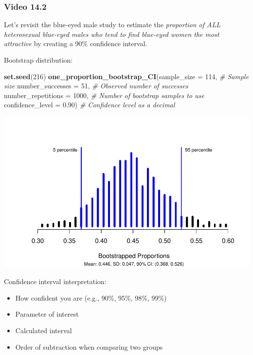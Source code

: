 \documentclass[
]{report}
\newenvironment{Shaded}{\begin{snugshade}}{\end{snugshade}}
\newcommand{\AttributeTok}[1]{\textcolor[rgb]{0.13,0.29,0.53}{#1}}
\newcommand{\CommentTok}[1]{\textcolor[rgb]{0.56,0.35,0.01}{\textit{#1}}}
\newcommand{\DecValTok}[1]{\textcolor[rgb]{0.00,0.00,0.81}{#1}}
\newcommand{\FloatTok}[1]{\textcolor[rgb]{0.00,0.00,0.81}{#1}}
\newcommand{\FunctionTok}[1]{\textcolor[rgb]{0.13,0.29,0.53}{\textbf{#1}}}
\newcommand{\NormalTok}[1]{#1}
\begin{document}
\subsubsection*{Video 14.2}\label{video-14.2}

Let's revisit the blue-eyed male study to estimate the \emph{proportion of ALL heterosexual blue-eyed males who tend to find blue-eyed women the most attractive} by creating a 90\% confidence interval.

Bootstrap distribution:

\begin{Shaded}
\begin{Highlighting}[]
\FunctionTok{set.seed}\NormalTok{(}\DecValTok{216}\NormalTok{)}
\FunctionTok{one\_proportion\_bootstrap\_CI}\NormalTok{(}\AttributeTok{sample\_size =} \DecValTok{114}\NormalTok{, }\CommentTok{\# Sample size}
                    \AttributeTok{number\_successes =} \DecValTok{51}\NormalTok{, }\CommentTok{\# Observed number of successes}
                    \AttributeTok{number\_repetitions =} \DecValTok{1000}\NormalTok{, }\CommentTok{\# Number of bootstrap samples to use}
                    \AttributeTok{confidence\_level =} \FloatTok{0.90}\NormalTok{) }\CommentTok{\# Confidence level as a decimal}
\end{Highlighting}
\end{Shaded}

\begin{center}\includegraphics[width=0.7\linewidth]{03-VN03-EDA_OneCatSimulation_files/figure-latex/unnamed-chunk-9-1} \end{center}

Confidence interval interpretation:

\begin{itemize}
\item
  How confident you are (e.g., 90\%, 95\%, 98\%, 99\%)
\item
  Parameter of interest
\item
  Calculated interval
\item
  Order of subtraction when comparing two groups
\end{itemize}
\end{document}
